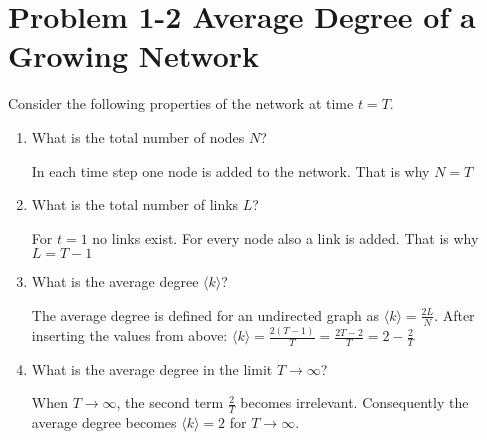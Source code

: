 \section{Problem 1-2 Average Degree of a Growing Network}

Consider the following properties of the network at time $t=T$.

\begin{enumerate}
	\item What is the total number of nodes $N$?
	
	In each time step one node is added to the network. That is why $N=T$
	
	\item What is the total number of links $L$?
	
	For $t=1$ no links exist. For every node also a link is added. That is why $L=T-1$
	
	\item What is the average degree $\langle k \rangle$?
	
	The average degree is defined for an undirected graph as $\langle k \rangle = \frac{2L}{N}$. After inserting the values from above: $\langle k \rangle = \frac{2(T-1)}{T} = \frac{2T-2}{T} = 2 - \frac{2}{T} $
	
	\item What is the average degree in the limit $T \rightarrow \infty$?
	
	When $T \rightarrow \infty$, the second term $\frac{2}{T}$ becomes irrelevant. Consequently the average degree becomes $\langle k \rangle = 2$ for $T \rightarrow \infty$.
	
\end{enumerate}